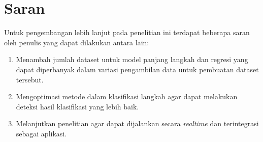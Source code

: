 \section{Saran}
\label{chap:saran}

Untuk pengembangan lebih lanjut pada penelitian ini terdapat beberapa saran oleh penulis yang dapat dilakukan antara lain:

\begin{enumerate}[nolistsep]

  \item Menambah jumlah dataset untuk model panjang langkah dan regresi yang dapat diperbanyak dalam variasi pengambilan data untuk pembuatan dataset tersebut.
  
  \item Mengoptimasi metode dalam klasifikasi langkah agar dapat melakukan deteksi hasil klasifikasi yang lebih baik.
  
  \item Melanjutkan penelitian agar dapat dijalankan secara \emph{realtime} dan terintegrasi sebagai aplikasi.

\end{enumerate}
